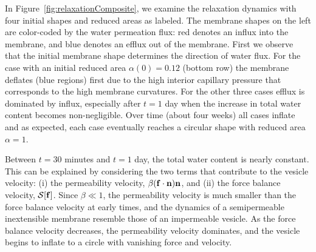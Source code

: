 \documentclass[prb,preprint,showpacs,preprintnumbers,amsmath,amssymb,longbibliography]{revtex4-1}
\begin{document}
In Figure~\ref{fig:relaxationComposite}, we examine the relaxation
dynamics with four initial shapes and reduced
areas as labeled. The membrane shapes on the left are color-coded by the water
permeation flux: red denotes an influx into the membrane, and blue
denotes an efflux out of the membrane. First we observe that the initial
membrane shape determines the direction of water flux. For the case
with an initial reduced area $\alpha(0)=0.12$ (bottom row) the membrane
deflates (blue regions) first due to the high interior capillary
pressure that corresponds to the high membrane curvatures. For the other
three cases efflux is dominated by influx, especially after $t=1$ day
when the increase in total water content becomes non-negligible.
%
%
Over time (about four weeks) all cases inflate and as expected, each
case eventually reaches a circular shape with reduced area
$\alpha=1$. 
%
%

Between $t=30$ minutes and $t=1$ day, the total water content is nearly constant.
%
%
This can be explained by considering the two terms that contribute to
the vesicle velocity: (i) the permeability velocity, $\beta(\mathbf{f} \cdot
\mathbf{n}) \mathbf{n}$, and (ii) the force balance velocity, $\mathcal{S}[\mathbf{f}]$. Since
$\beta\ll 1$, the permeability velocity is much smaller than the force
balance velocity at early times, and the dynamics of a semipermeable inextensible membrane
resemble those of an impermeable vesicle. As the force balance velocity
decreases, the permeability velocity dominates, and the vesicle begins
to inflate to a circle with vanishing force and velocity. 
\end{document}
